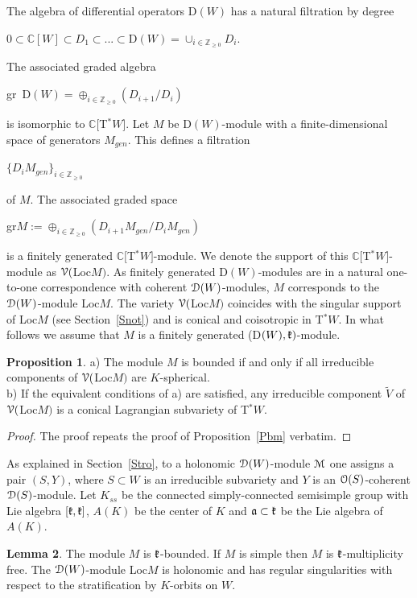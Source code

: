 \documentclass[12pt]{amsart}
\theoremstyle{definition}\newtheorem{theorem}{Theorem}[section]
\newtheorem{proposition}{Proposition}[section]
\newtheorem{lemma}[proposition]{Lemma}
\theoremstyle{definition}\newtheorem{definition}[proposition]{Definition}
\theoremstyle{remark}\newtheorem{example}[proposition]{Example}
\begin{document}
The algebra of differential operators D$(W)$ has a natural filtration  by degree \begin{center}$0\subset\mathbb C[W]\subset D_1\subset...\subset$D$(W)=\cup_{i\in\mathbb Z_{\ge0}}D_i$.\end{center} The associated graded algebra \begin{center}gr~D$(W) =\oplus_{i\in\mathbb Z_{\ge0}}(D_{i+1}/D_i)$\end{center} is isomorphic to $\mathbb C[$T$^*W]$. Let $M$ be D$(W)$-module with a finite-dimensional space of generators $M_{gen}$. This defines a filtration \begin{center}$\{D_iM_{gen}\}_{i\in\mathbb Z_{\ge0}}$\end{center} of $M$. The associated graded space \begin{center}gr$M:=\oplus_{i\in\mathbb Z_{\ge0}}(D_{i+1}M_{gen}/D_iM_{gen})$\end{center} is a finitely generated $\mathbb C[$T$^*W]$-module. We denote the support of this $\mathbb C[$T$^*W]$-module as $\EuScript V($Loc$M)$. As finitely generated D$(W)$-modules are in a natural one-to-one correspondence with coherent $\EuScript D(W)$-modules, $M$ corresponds to the $\EuScript D(W)$-module Loc$M$. The variety $\EuScript V($Loc$M)$ coincides with the singular support of Loc$M$ (see Section~\ref{Snot}) and is conical and coisotropic in T$^*W$. In what follows we assume that $M$ is a finitely generated (D$(W), \frak k)$-module.
\begin{proposition}\label{Pdbm}a) The module $M$ is bounded if and only if all irreducible components of $\EuScript V($Loc$M)$ are $K$-spherical.\\ b) If the equivalent conditions of a) are satisfied, any irreducible component $\tilde V$ of $\EuScript V($Loc$M)$ is a conical Lagrangian subvariety of T$^*W$.\end{proposition}
\begin{proof}The proof repeats the proof of Proposition~\ref{Pbm} verbatim.\end{proof}
As explained in Section~\ref{Stro}, to a holonomic $\EuScript D(W)$-module $\EuScript M$ one assigns a pair $(S, Y)$, where $S\subset W$ is an irreducible subvariety and $Y$ is an $\EuScript O(S)$-coherent $\EuScript D(S)$-module. Let $K_{ss}$ be the connected simply-connected semisimple group with Lie algebra $[\frak k, \frak k]$, $A(K)$ be the center of $K$ and $\frak a\subset\frak k$ be the Lie algebra of $A(K)$.
\begin{lemma}\label{Lkrs}The module $M$ is $\frak k$-bounded. If $M$ is simple then $M$ is $\frak k$-multiplicity free. The $\EuScript D(W)$-module Loc$M$ is holonomic and has regular singularities with respect to the stratification by $K$-orbits on $W$.\end{lemma}
\end{document}

